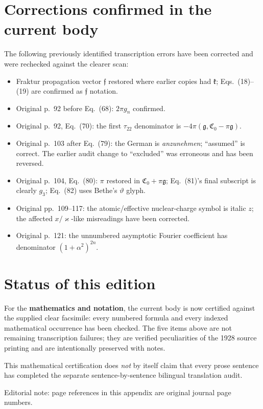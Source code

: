 \documentclass[10pt]{article}
\begin{document}
\section{Corrections confirmed in the current body}

The following previously identified transcription errors have been corrected and were rechecked against the clearer scan:
\begin{itemize}
\item Fraktur propagation vector $\mathfrak f$ restored where earlier copies had $\mathfrak k$; Eqs.~(18)--(19) are confirmed as $\mathfrak f$ notation.
\item Original p.~92 before Eq.~(68): $2\pi g_n$ confirmed.
\item Original p.~92, Eq.~(70): the first $\tau_{22}$ denominator is $-4\pi(\mathfrak g,\mathfrak C_0-\pi\mathfrak g)$.
\item Original p.~103 after Eq.~(79): the German is \textit{anzunehmen}; ``assumed'' is correct. The earlier audit change to ``excluded'' was erroneous and has been reversed.
\item Original p.~104, Eq.~(80): $\pi$ restored in $\mathfrak C_0+\pi\mathfrak g$; Eq.~(81)'s final subscript is clearly $g_3$; Eq.~(82) uses Bethe's $\vartheta$ glyph.
\item Original pp.~109--117: the atomic/effective nuclear-charge symbol is italic $z$; the affected $x/\varkappa$-like misreadings have been corrected.
\item Original p.~121: the unnumbered asymptotic Fourier coefficient has denominator $(1+\alpha^2)^{2n}$.
\end{itemize}

\section{Status of this edition}

For the \textbf{mathematics and notation}, the current body is now certified against the supplied clear facsimile: every numbered formula and every indexed mathematical occurrence has been checked. The five items above are not remaining transcription failures; they are verified peculiarities of the 1928 source printing and are intentionally preserved with notes.

This mathematical certification does \emph{not} by itself claim that every prose sentence has completed the separate sentence-by-sentence bilingual translation audit.

\begin{center}
\end{center}

\vfill
{\small\color{darkgray}Editorial note: page references in this appendix are original journal page numbers.}
\end{document}
